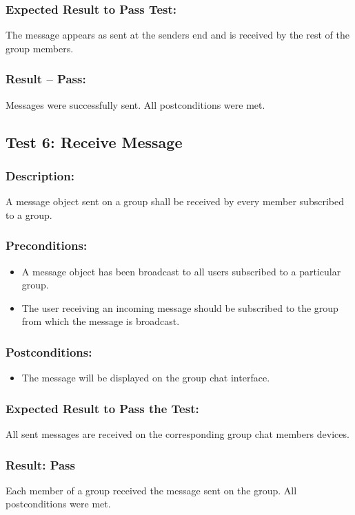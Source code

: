 \documentclass[11pt]{article}
\begin{document}
\subsubsection{Expected Result to Pass Test:}
The message appears as sent at the senders end and is received by the rest of the group members.
\subsubsection{Result -- Pass:}
Messages were successfully sent. All postconditions were met.

\subsection{Test 6: Receive Message}
\subsubsection{Description:}
A message object sent on a group shall be received
by every member subscribed to a group.
\subsubsection{Preconditions:} 
\begin{itemize}
\item A message object has been broadcast to all users subscribed to a particular group.
\item The user receiving an incoming message should be subscribed to the
group from which the message is broadcast.
\end{itemize}
\subsubsection{Postconditions:}
\begin{itemize}
\item The message will be displayed on the group chat interface.
\end{itemize}
\subsubsection{Expected Result to Pass the Test:}
All sent messages are received on the corresponding group chat members devices.
\subsubsection{Result: Pass}
Each member of a group received the message sent on the group. All postconditions were met.
\end{document}
